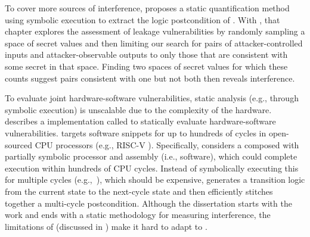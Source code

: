 To cover more sources of interference,  proposes
a static quantification method using symbolic execution to extract the
logic postcondition \postcondition{\proc}{} of \proc.  With
\postcondition{\proc}{}, that chapter explores the assessment of
leakage vulnerabilities by randomly sampling a space of secret values
and then limiting our search for pairs of attacker-controlled inputs
and attacker-observable outputs to only those that are consistent with
some secret in that space. Finding two spaces of secret values for
which these counts suggest pairs consistent with one but not both then
reveals interference.

To evaluate joint hardware-software vulnerabilities, static analysis
(e.g., through symbolic execution) is unscalable due to the complexity
of the hardware.  describes a implementation
called \thirdsysname to statically evaluate hardware-software
vulnerabilities.  \thirdsysname targets software snippets for up to
hundreds of cycles in open-sourced CPU processors (e.g., RISC-V
\boom). Specifically, \thirdsysname considers a \proc composed with
partially symbolic processor and assembly (i.e., software), which
could complete execution within hundreds of CPU cycles.  Instead of
symbolically executing this \proc for multiple cycles
(e.g.,~\cite{ruiHardware}), which should be expensive, \thirdsysname
generates a transition logic from the current state to the next-cycle
state and then efficiently stitches together a multi-cycle
postcondition.  Although the dissertation starts with the \cachebar
work and ends with a static methodology for measuring interference,
the limitations of \thirdsysname (discussed in
) make it hard to adapt to \cachebar.

